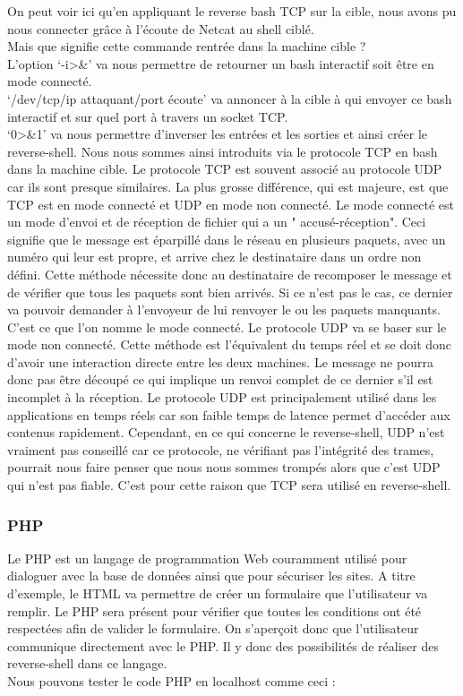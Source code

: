 On peut voir ici qu’en appliquant le reverse bash TCP sur la cible, nous avons pu nous connecter grâce à l’écoute de Netcat au shell ciblé.\\
Mais que signifie cette commande rentrée dans la machine cible ?\\
L’option ‘-i>&’ va nous permettre de retourner un bash interactif soit être en mode connecté.\\
‘/dev/tcp/ip attaquant/port écoute’ va annoncer à la cible à qui envoyer ce bash interactif et sur quel port à travers un socket TCP.\\
‘0>&1’ va nous permettre d’inverser les entrées et les sorties et ainsi créer le reverse-shell.
Nous nous sommes ainsi introduits via le protocole TCP en bash dans la machine cible.
Le protocole TCP est souvent associé au protocole UDP car ils sont presque similaires. La plus grosse différence, qui est majeure, est que TCP est en mode connecté et UDP en mode non connecté. Le mode connecté est un mode d'envoi et de réception de fichier qui a un " accusé-réception". Ceci signifie que le message est éparpillé dans le réseau en plusieurs paquets, avec un numéro qui leur est propre, et arrive chez le destinataire dans un ordre non défini. Cette méthode nécessite donc au destinataire de recomposer le message et de vérifier que tous les paquets sont bien arrivés. Si ce n'est pas le cas, ce dernier va pouvoir demander à l'envoyeur de lui renvoyer le ou les paquets manquants. C'est ce que l'on nomme le mode connecté. Le protocole UDP va se baser sur le mode non connecté. Cette méthode est l'équivalent du temps réel et se doit donc d'avoir une interaction directe entre les deux machines. Le message ne pourra donc pas être découpé ce qui implique un renvoi complet de ce dernier s'il est incomplet à la réception. Le protocole UDP est principalement utilisé dans les applications en temps réels car son faible temps de latence permet d'accéder aux contenus rapidement. Cependant, en ce qui concerne le reverse-shell, UDP n'est vraiment pas conseillé car ce protocole, ne vérifiant pas l'intégrité des trames, pourrait nous faire penser que nous nous sommes trompés alors que c'est UDP qui n'est pas fiable. C'est pour cette raison que TCP sera utilisé en reverse-shell.

\newpage
\subsubsection{PHP}

Le PHP est un langage de programmation Web couramment utilisé pour dialoguer avec la base de données ainsi que pour sécuriser les sites. A titre d'exemple, le HTML va permettre de créer un formulaire que l'utilisateur va remplir. Le PHP sera présent pour vérifier que toutes les conditions ont été respectées afin de valider le formulaire. On s'aperçoit donc que l'utilisateur communique directement avec le PHP. Il y donc des possibilités de réaliser des reverse-shell dans ce langage.\\
Nous pouvons tester le code PHP en localhost comme ceci :

